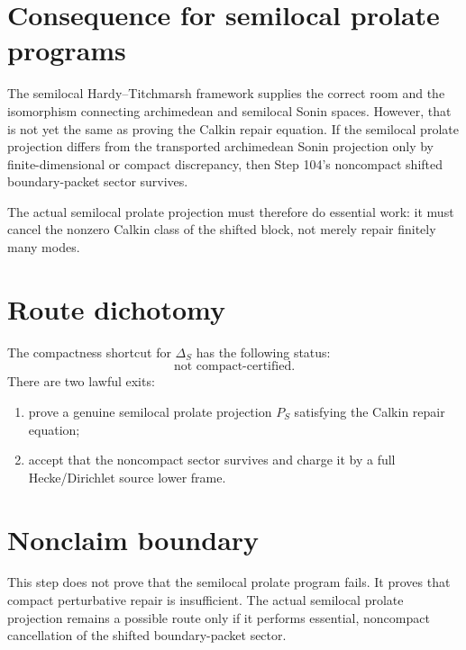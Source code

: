 \documentclass[11pt]{article}
\begin{document}
\section{Consequence for semilocal prolate programs}
The semilocal Hardy--Titchmarsh framework supplies the correct room and the isomorphism connecting archimedean and semilocal Sonin spaces. However, that is not yet the same as proving the Calkin repair equation. If the semilocal prolate projection differs from the transported archimedean Sonin projection only by finite-dimensional or compact discrepancy, then Step 104's noncompact shifted boundary-packet sector survives.

The actual semilocal prolate projection must therefore do essential work: it must cancel the nonzero Calkin class of the shifted block, not merely repair finitely many modes.

\section{Route dichotomy}
The compactness shortcut for $\Delta_S$ has the following status:
\[
\boxed{\text{not compact-certified.}}
\]
There are two lawful exits:
\begin{enumerate}
\item prove a genuine semilocal prolate projection $P_S$ satisfying the Calkin repair equation;
\item accept that the noncompact sector survives and charge it by a full Hecke/Dirichlet source lower frame.
\end{enumerate}

\section{Nonclaim boundary}
This step does not prove that the semilocal prolate program fails. It proves that compact perturbative repair is insufficient. The actual semilocal prolate projection remains a possible route only if it performs essential, noncompact cancellation of the shifted boundary-packet sector.
\end{document}
